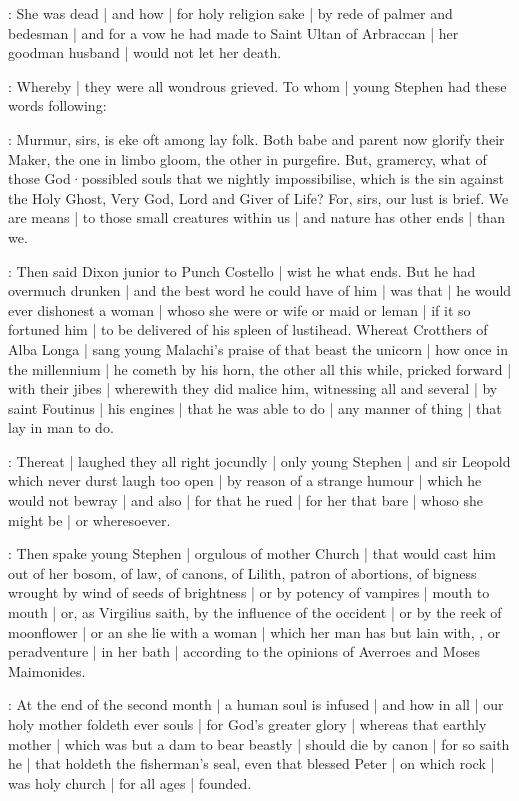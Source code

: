 \madden:
She was dead |
and how |
for holy religion sake |
by rede of palmer and bedesman |
and for a vow he had made to Saint Ultan of Arbraccan |
her goodman husband |
would not let her death.

:
Whereby |
they were all wondrous grieved.
To whom |
young Stephen had these words following:

\stephen:
Murmur,
sirs,
is eke oft among lay folk.
Both babe and parent now glorify their Maker,
the one in limbo gloom,
the other in purgefire.
But,
gramercy,
what of those God·possibled souls that we nightly impossibilise,
which is the sin against the Holy Ghost,
Very God,
Lord and Giver of Life?
For,
sirs,
our lust is brief.
We are means |
to those small creatures within us |
and nature has other ends |
than we.

:
Then said Dixon junior to Punch Costello |
wist he what ends.
But he had overmuch drunken |
and the best word he could have of him |
was that |
he would ever dishonest a woman |
whoso she were or wife or maid or leman |
if it so fortuned him |
to be delivered of his spleen of lustihead.
Whereat Crotthers of Alba Longa |
sang young Malachi's praise of that beast the unicorn |
how once in the millennium |
he cometh by his horn,
the other all this while,
pricked forward |
with their jibes |
wherewith they did malice him,
witnessing all and several |
by saint Foutinus |
his engines |
that he was able to do |
any manner of thing |
that lay in man to do.

:
Thereat |
laughed they all right jocundly |
only young Stephen |
and sir Leopold which never durst laugh too open |
by reason of a strange humour |
which he would not bewray |
and also |
for that he rued |
for her that bare |
whoso she might be |
or wheresoever.

:
Then spake young Stephen |
orgulous of mother Church |
that would cast him out of her bosom,
of law,
of canons,
of Lilith,
patron of abortions,
of bigness wrought by wind of seeds of brightness |
or by potency of vampires |
mouth to mouth |
or,
as Virgilius saith,
by the influence of the occident |
or by the reek of moonflower |
or an she lie with a woman |
which her man has but lain with,
,
or peradventure |
in her bath |
according to the opinions of Averroes and Moses Maimonides.

\stephen:
At the end of the second month |
a human soul is infused |
and how in all |
our holy mother foldeth ever souls |
for God's greater glory |
whereas that earthly mother |
which was but a dam to bear beastly |
should die by canon |
for so saith he |
that holdeth the fisherman's seal,
even that blessed Peter |
on which rock |
was holy church |
for all ages |
founded.

